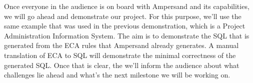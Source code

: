 \documentclass[12pt]{article}
\begin{document}
Once everyone in the audience is on board with Ampersand and its capabilities, 
we will go ahead and demonstrate our project. For this purpose, we'll use the 
same example that was used in the previous demonstration, which is a Project 
Administration Information System. The aim is to demonstrate the SQL that is 
generated from the ECA rules that Ampersand already generates. A manual 
translation of ECA to SQL will demonstrate the minimal correctness of the 
generated SQL. Once that is clear, the we'll inform the audience about what 
challenges lie ahead and what's the next milestone we will be working on.
\end{document}
